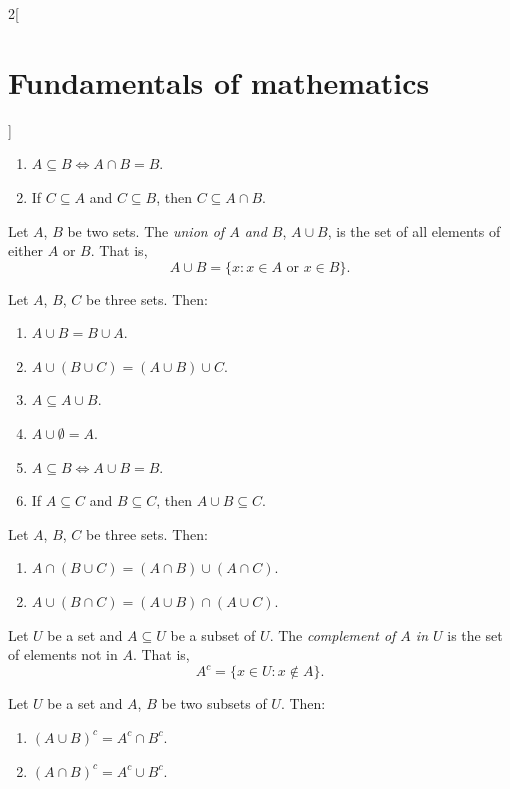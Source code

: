 \documentclass[../../../main.tex]{subfiles}
\begin{document}
\begin{multicols}{2}[\section{Fundamentals of mathematics}]
\begin{prop}
\begin{enumerate}
            \item $A\subseteq B\iff A\cap B=B$.
            \item If $C\subseteq A$ and $C\subseteq B$, then $C\subseteq A\cap B$.
        \end{enumerate}
    \end{prop}
    \begin{definition}
        Let $A$, $B$ be two sets. The \textit{union of $A$ and $B$}, $A\cup B$, is the set of all elements of either $A$ or $B$. That is, $$A\cup B=\{x:x\in A\text{ or }x\in B\}.$$
    \end{definition}
    \begin{prop}
        Let $A$, $B$, $C$ be three sets. Then:
        \begin{enumerate}
            \item $A\cup B=B\cup A$.
            \item $A\cup(B\cup C)=(A\cup B)\cup C$.
            \item $A\subseteq A\cup B$.
            \item $A\cup\emptyset=A$.
            \item $A\subseteq B\iff A\cup B=B$.
            \item If $A\subseteq C$ and $B\subseteq C$, then $A\cup B\subseteq C$.
        \end{enumerate}
    \end{prop}
    \begin{prop}
        Let $A$, $B$, $C$ be three sets. Then:
        \begin{enumerate}
            \item $A\cap (B\cup C)=(A\cap B)\cup (A\cap C)$.
            \item $A\cup (B\cap C)=(A\cup B)\cap (A\cup C)$.
        \end{enumerate}
    \end{prop}
    \begin{definition}
        Let $U$ be a set and $A\subseteq U$ be a subset of $U$. The \textit{complement of $A$ in $U$} is the set of elements not in $A$. That is, $$A^c=\{x\in U:x\notin A\}.$$
    \end{definition}
    \begin{prop}
        Let $U$ be a set and $A$, $B$ be two subsets of $U$. Then:
        \begin{enumerate}
            \item $(A\cup B)^c=A^c\cap B^c$.
            \item $(A\cap B)^c=A^c\cup B^c$.

\end{enumerate}
\end{prop}
\end{multicols}
\end{document}
